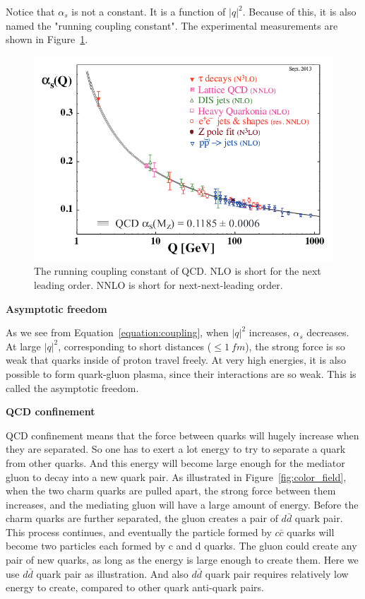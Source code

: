 Notice that $\alpha_{s}$ is not a constant. It is a function of $|q|^2$. Because of this, it is also 
named the "running coupling constant".  The experimental measurements are shown 
in Figure~\ref{figs:coupling}.

\begin{figure}[htb]
\centering
\includegraphics[width=.7\textwidth]{figures/alphasrunning.png}
\caption{The running coupling constant of QCD. NLO is short for the next leading order.
NNLO is short for next-next-leading order.}
\label{figs:coupling}
\end{figure}  

 
{\bf Asymptotic freedom}

As we see from Equation~\ref{equation:coupling}, 
when $|q|^2$ increases, $\alpha_{s}$ decreases. 
At  large $|q|^2$, corresponding to
short distances (${\leq}1~fm$),  the strong force 
is so weak that quarks inside of proton travel freely.  At very high energies, 
it is also possible to form quark-gluon plasma, since their interactions are so weak. 
This is called the asymptotic freedom. 

{\bf QCD confinement}


QCD confinement means that the force between quarks will hugely increase when they are separated. 
So one has to exert a lot energy to try to separate a quark from other quarks. And this energy will
become large enough for the mediator gluon to decay into a new quark pair. 
As illustrated in Figure~\ref{fig:color_field},  when the two charm quarks are pulled apart, the 
strong force between them increases, and the mediating gluon will have 
a large amount of energy. Before the charm quarks are further separated, the gluon  
creates a pair of $d\bar{d}$ quark pair. This process continues,  and eventually the particle formed by 
$c\bar{c}$ quarks will become 
two particles each formed by c and d quarks. The gluon could create any pair of new quarks, 
as long as the energy is large enough to create them. Here we use $d\bar{d}$ quark pair as illustration. 
And also $d\bar{d}$ quark pair requires relatively low energy to create, compared to other quark anti-quark pairs. 

